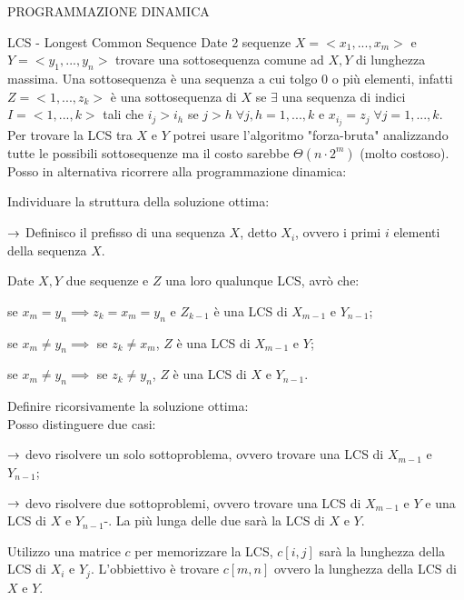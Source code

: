 \documentclass[8pt]{extarticle}
\begin{document}
\begin{formulario}
\begin{myParagraph}{PROGRAMMAZIONE DINAMICA}
		\begin{subParagraph}{LCS - Longest Common Sequence}
Date 2 sequenze $X=<x_1,...,x_m>$ e $Y=<y_1,...,y_n>$ trovare una sottosequenza comune ad $X,Y$ di lunghezza massima. Una sottosequenza è una sequenza a cui tolgo $0$ o più elementi, infatti $Z=<1,...,z_k>$ è una sottosequenza di $X$ se $\exists$ una sequenza di indici $I=<1,...,k>$ tali che $i_j>i_h$ se $j>h\;\forall j,h=1,...,k$ e $x_{i_j}=z_j \; \forall j=1,...,k$.\\
Per trovare la LCS tra $X$ e $Y$ potrei usare l'algoritmo "forza-bruta" analizzando tutte le possibili sottosequenze ma il costo sarebbe $\Theta(n\cdot 2^m)$ (molto costoso). Posso in alternativa ricorrere alla programmazione dinamica:
			\begin{itemize}
		\item Individuare la struttura della soluzione ottima:\\
				\end{Descr}
		\item Definire ricorsivamente la soluzione ottima:\\
Posso distinguere due casi:
				\begin{Descr}
			\item[\bm{$x_m = y_n$}] $\rightarrow$ devo risolvere un solo sottoproblema, ovvero trovare una LCS di $X_{m-1}$ e $Y_{n-1}$;
			\item[\bm{$x_m \neq y_n$}] $\rightarrow$ devo risolvere due sottoproblemi, ovvero trovare una LCS di $X_{m-1}$ e $Y$ e una LCS di $X$ e $Y_{n-1}$-. La più lunga delle due sarà la LCS di $X$ e $Y$.
 				\end{Descr}
Utilizzo una matrice $c$ per memorizzare la LCS, $c[i,j]$ sarà la lunghezza della LCS di $X_i$ e $Y_j$. L'obbiettivo è trovare $c[m,n]$ ovvero la lunghezza della LCS di $X$ e $Y$. \\

\end{itemize}
\end{subParagraph}
\end{myParagraph}
\end{formulario}
\end{document}
